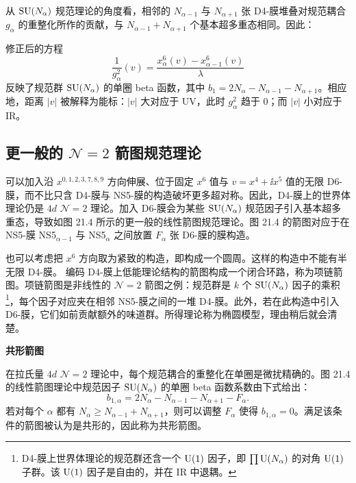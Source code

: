 从 $\operatorname{SU}(N_\alpha)$ 规范理论的角度看，相邻的 $N_{\alpha-1}$ 与 $N_{\alpha+1}$ 张 D4-膜堆叠对规范耦合 $g_\alpha$ 的重整化所作的贡献，与 $N_{\alpha-1}+N_{\alpha+1}$ 个基本超多重态相同。因此：

\begin{proposition}[21.5] 修正后的方程
\begin{equation}
\frac{1}{g_\alpha^2}(v)=\frac{x^6_\alpha(v)-x^6_{\alpha-1}(v)}{\lambda}
\tag{21.4}
\end{equation}
反映了规范群 $\operatorname{SU}(N_\alpha)$ 的单圈 beta 函数，其中 $b_1=2N_\alpha-N_{\alpha-1}-N_{\alpha+1}$。相应地，距离 $|v|$ 被解释为能标：$|v|$ 大对应于 UV，此时 $g_\alpha^2$ 趋于 0；而 $|v|$ 小对应于 IR。\end{proposition}

\subsection{更一般的 $\mathcal{N}=2$ 箭图规范理论}

可以加入沿 $x^{0,1,2,3,7,8,9}$ 方向伸展、位于固定 $x^6$ 值与 $v=x^4+\ii x^5$ 值的无限 D6-膜，而不比只含 D4-膜与 NS5-膜的构造破坏更多超对称。因此，D4-膜上的世界体理论仍是 $4d$ $\mathcal{N}=2$ 理论。加入 D6-膜会为某些 $\operatorname{SU}(N_\alpha)$ 规范因子引入基本超多重态，导致如图 21.4 所示的更一般的线性箭图规范理论。图 21.4 的箭图对应于在 NS5-膜 NS5$_{\alpha-1}$ 与 NS5$_\alpha$ 之间放置 $F_\alpha$ 张 D6-膜的膜构造。


也可以考虑把 $x^6$ 方向取为紧致的构造，即构成一个圆周。这样的构造中不能有半无限 D4-膜。
编码 D4-膜上低能理论结构的箭图构成一个闭合环路，称为项链箭图。项链箭图是非线性的 $\mathcal{N}=2$ 箭图之例：规范群是 $k$ 个 $\operatorname{SU}(N_\alpha)$ 因子的乘积\footnote{D4-膜上世界体理论的规范群还含一个 $\operatorname{U}(1)$ 因子，即 $\prod\operatorname{U}(N_\alpha)$ 的对角 $\operatorname{U}(1)$ 子群。该 $\operatorname{U}(1)$ 因子是自由的，并在 IR 中退耦。}，每个因子对应夹在相邻 NS5-膜之间的一堆 D4-膜。此外，若在此构造中引入 D6-膜，它们如前贡献额外的味道群。所得理论称为椭圆模型，理由稍后就会清楚。

\noindent\textbf{共形箭图}

在拉氏量 $4d$ $\mathcal{N}=2$ 理论中，每个规范耦合的重整化在单圈是微扰精确的。图 21.4 的线性箭图理论中规范因子 $\operatorname{SU}(N_\alpha)$ 的单圈 beta 函数系数由下式给出：
\[
b_{1,\alpha}=2N_\alpha-N_{\alpha-1}-N_{\alpha+1}-F_\alpha.
\]
若对每个 $\alpha$ 都有 $N_\alpha\ge N_{\alpha-1}+N_{\alpha+1}$，则可以调整 $F_\alpha$ 使得 $b_{1,\alpha}=0$。满足该条件的箭图被认为是共形的，因此称为共形箭图。

